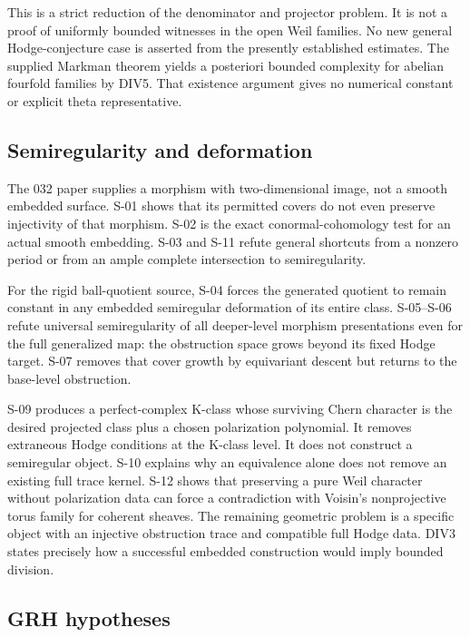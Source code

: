 \documentclass[11pt,a4paper]{article}
\theoremstyle{definition}
\begin{document}
This is a strict reduction of the denominator and projector problem. It
is not a proof of uniformly bounded witnesses in the open Weil families.
No new general Hodge-conjecture case is asserted from the presently
established estimates. The supplied Markman theorem yields a posteriori
bounded complexity for abelian fourfold families by DIV5. That existence
argument gives no numerical constant or explicit theta representative.

\subsection{Semiregularity and
deformation}\label{semiregularity-and-deformation}

The 032 paper supplies a morphism with two-dimensional image, not a
smooth embedded surface. S-01 shows that its permitted covers do not
even preserve injectivity of that morphism. S-02 is the exact
conormal-cohomology test for an actual smooth embedding. S-03 and S-11
refute general shortcuts from a nonzero period or from an ample complete
intersection to semiregularity.

For the rigid ball-quotient source, S-04 forces the generated quotient
to remain constant in any embedded semiregular deformation of its entire
class. S-05--S-06 refute universal semiregularity of all deeper-level
morphism presentations even for the full generalized map: the
obstruction space grows beyond its fixed Hodge target. S-07 removes that
cover growth by equivariant descent but returns to the base-level
obstruction.

S-09 produces a perfect-complex K-class whose surviving Chern character
is the desired projected class plus a chosen polarization polynomial. It
removes extraneous Hodge conditions at the K-class level. It does not
construct a semiregular object. S-10 explains why an equivalence alone
does not remove an existing full trace kernel. S-12 shows that
preserving a pure Weil character without polarization data can force a
contradiction with Voisin's nonprojective torus family for coherent
sheaves. The remaining geometric problem is a specific object with an
injective obstruction trace and compatible full Hodge data. DIV3 states
precisely how a successful embedded construction would imply bounded
division.

\subsection{GRH hypotheses}\label{grh-hypotheses}
\end{document}
